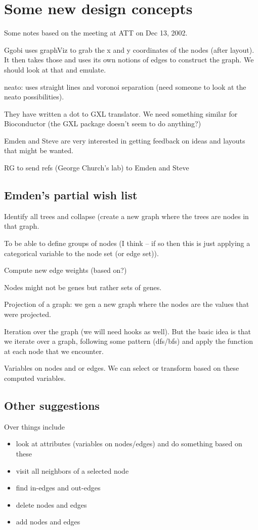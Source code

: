 \section{Some new design concepts}

Some notes based on the meeting at ATT on Dec 13, 2002.

Ggobi uses graphViz to grab the x and y coordinates of the nodes
(after layout). It then takes those and uses its own notions of edges
to construct the graph.
We should look at that and emulate.

neato: uses straight lines and voronoi separation (need someone to
look at the neato possibilities).

They have written a dot to GXL translator. We need something similar
for Bioconductor (the GXL package doesn't seem to do anything?)

Emden and Steve are very interested in getting feedback on ideas and
layouts that might be wanted.

RG to send refs (George Church's lab) to Emden and Steve

\subsection{Emden's partial wish list}

Identify all trees and collapse (create a new graph where the trees
are nodes in that graph.

To be able to define groups of nodes (I think -- if so then this is
just applying a categorical variable to the node set (or edge set)).

Compute new edge weights (based on?)

Nodes might not be genes but rather sets of genes.

Projection of a graph: we gen a new graph where the nodes are the
values that were projected.

Iteration over the graph (we will need hooks as well). But the basic
idea is that we iterate over a graph, following some pattern (dfs/bfs)
and apply the function at each node that we encounter.

Variables on nodes and or edges. We can select or transform based on
these computed variables.


\subsection{Other suggestions}

Over things include
\begin{itemize}
\item look at attributes (variables on nodes/edges) and do something
  based on these
\item visit all neighbors of a selected node
\item find in-edges and out-edges
\item delete nodes and edges
\item add nodes and edges

\end{itemize}

